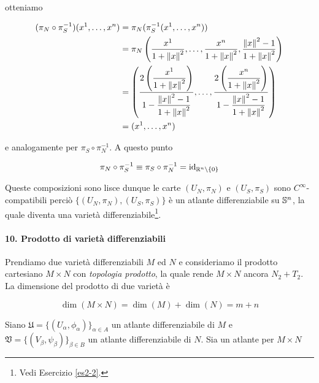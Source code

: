 otteniamo

\begin{align}
	\begin{split}
		(\pi_{N} \circ \pi_{S}^{-1}) (x^{1},\dots,x^{n}) &= \pi_{N} (\pi_{S}^{-1} (x^{1},\dots,x^{n}))\\
		&= \pi_{N} \left( \dfrac{x^{1}}{1+\norm{x}^{2}},\dots,\dfrac{x^{n}}{1+\norm{x}^{2}},\dfrac{\norm{x}^{2}-1}{1+\norm{x}^{2}} \right)\\
		&= \left( \dfrac{ 2 \left( \dfrac{x^{1}}{1 + \norm{x}^{2}} \right) }{ 1 - \dfrac{\norm{x}^{2} - 1}{1 + \norm{x}^{2}} }, \dots, \dfrac{ 2 \left( \dfrac{x^{n}}{1 + \norm{x}^{2}} \right) }{ 1 - \dfrac{\norm{x}^{2} - 1}{1 + \norm{x}^{2}} } \right)\\
		&= (x^{1},\dots,x^{n})
	\end{split}
\end{align}

e analogamente per $ \pi_{S} \circ \pi_{N}^{-1} $. A questo punto

\begin{equation}
	\pi_{N} \circ \pi_{S}^{-1} \equiv \pi_{S} \circ \pi_{N}^{-1} = \id_{\R^{n} \setminus \{0\}}
\end{equation}

Queste composizioni sono lisce dunque le carte $ (U_{N},\pi_{N}) $ e $ (U_{S},\pi_{S}) $ sono $ C^{\infty} $-compatibili perciò $ \{(U_{N},\pi_{N}),(U_{S},\pi_{S})\} $ è un atlante differenziabile su $ \S^{n} $, la quale diventa una varietà differenziabile\footnote{%
	Vedi Esercizio \ref{es2-2}.%
}.

\paragraph{10. Prodotto di varietà differenziabili}

Prendiamo due varietà differenziabili $ M $ ed $ N $ e consideriamo il prodotto cartesiano $ M \times N $ con \textit{topologia prodotto}, la quale rende $ M \times N $ ancora $ N_{2}+T_{2} $. La dimensione del prodotto di due varietà è

\begin{equation}
	\dim (M \times N) = \dim(M) + \dim(N) = m + n
\end{equation}

Siano $ \mathfrak{U} = \{(U_{\alpha},\phi_{\alpha})\}_{\alpha \in A} $ un atlante differenziabile di $ M $ e $ \mathfrak{V} = \{(V_{\beta},\psi_{\beta})\}_{\beta \in B} $ un atlante differenziabile di $ N $. Sia un atlante per $ M \times N $

